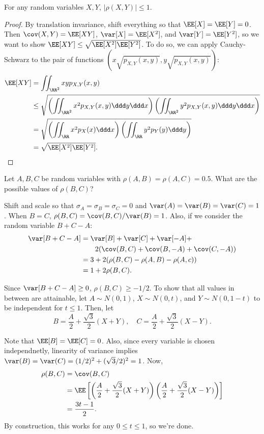 \begin{theorem}
\lemlabel

For any random variables $X,Y$, $\vert \rho(X,Y)\vert \leq 1$. 
\end{theorem}

\begin{proof}
By translation invariance, shift everything so that $\EE[X] = \EE[Y] = 0$. Then $\cov(X,Y) = \EE[XY]$, $\var[X] = \EE[X^2]$, and $\var[Y] = \EE[Y^2]$, so we want to show $\EE[XY] \leq \sqrt{\EE[X^2]\EE[Y^2]}$. To do so, we can apply Cauchy-Schwarz to the pair of functions $(x\sqrt{p_{X,Y}(x,y)}, y\sqrt{p_{X,Y}(x,y)})$:
\begin{align*}
    \EE[XY] &= \iint_{\RR^2}xyp_{X,Y}(x,y) \\
    & \leq \sqrt{\left(\iint_{\RR^2} x^2p_{X,Y}(x,y)\ddd y \ddd x\right)\left(\iint_{\RR^2} y^2p_{X,Y}(x,y)\ddd y \ddd x\right)} \\
    &= \sqrt{\left(\iint_{\RR}x^2p_X(x)\ddd x\right)\left(\iint_{\RR}y^2p_Y(y)\ddd y\right)} \\ 
    &= \sqrt{\EE[X^2]\EE[Y^2]}.
\end{align*}
\end{proof}

\begin{example}
\exlabel

Let $A,B,C$ be random variables with $\rho(A,B) = \rho(A,C) = 0.5$. What are the possible values of $\rho(B,C)$?
\end{example}

Shift and scale so that $\sigma_A = \sigma_B = \sigma_C = 0$ and $\var(A) = \var(B) = \var(C) = 1$. When $B=C$, $\rho(B,C) = \cov(B,C) / \var(B) = 1$. Also, if we consider the random variable $B+C-A$: 
\begin{align*}
    \var[B+C-A] &= \var[B] + \var[C] + \var[-A] + \\
    &\qquad 2(\cov(B,C) + \cov(B, -A) + \cov(C, -A))\\
    &= 3+2(\rho(B,C) - \rho(A,B) - \rho(A,c)) \\
    &= 1+2\rho(B,C).
\end{align*}

Since $\var[B+C-A]\geq 0$, $\rho(B,C)\geq -1/2$. To show that all values in between are attainable, let $A\sim N(0,1)$, $X\sim N(0,t)$, and $Y\sim N(0,1-t)$ to be independent for $t\leq 1$. Then, let 
\[B = \frac{A}{2} + \frac{\sqrt{3}}{2}(X+Y), \quad C = \frac{A}{2} + \frac{\sqrt{3}}{2}(X-Y).\]

Note that $\EE[B] = \EE[C] = 0$. Also, since every variable is chosen independnetly, linearity of variance implies $\var(B) = \var(C) = (1/2)^2 + (\sqrt{3}/2)^2 = 1$. Now, 
\begin{align*}
    \rho(B,C) &= \cov(B,C) \\
    &= \EE\left[\left(\frac{A}{2} + \frac{\sqrt{3}}{2}(X+Y)\right)\left(\frac{A}{2} + \frac{\sqrt{3}}{2}(X-Y)\right)\right] \\
    &= \frac{3t-1}{2}.
\end{align*}
By construction, this works for any $0\leq t\leq 1$, so we're done.

